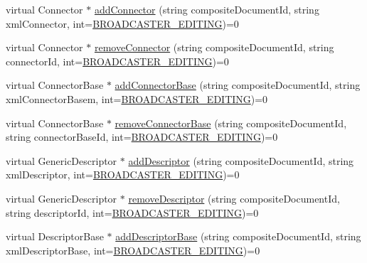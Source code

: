 \begin{DoxyCompactItemize}
\item 
virtual Connector $\ast$ \hyperlink{classbr_1_1ufscar_1_1lince_1_1ginga_1_1wac_1_1editing_1_1IFormatterAdapter_a540918ec7898b4400e8a6884f250516e}{addConnector} (string compositeDocumentId, string xmlConnector, int=\hyperlink{classbr_1_1ufscar_1_1lince_1_1ginga_1_1wac_1_1editing_1_1IFormatterAdapter_a60586f9a11e5cefcfecef9386c28d4bd}{BROADCASTER\_\-EDITING})=0
\item 
virtual Connector $\ast$ \hyperlink{classbr_1_1ufscar_1_1lince_1_1ginga_1_1wac_1_1editing_1_1IFormatterAdapter_a825cefaf9055043bef55540808f736e4}{removeConnector} (string compositeDocumentId, string connectorId, int=\hyperlink{classbr_1_1ufscar_1_1lince_1_1ginga_1_1wac_1_1editing_1_1IFormatterAdapter_a60586f9a11e5cefcfecef9386c28d4bd}{BROADCASTER\_\-EDITING})=0
\item 
virtual ConnectorBase $\ast$ \hyperlink{classbr_1_1ufscar_1_1lince_1_1ginga_1_1wac_1_1editing_1_1IFormatterAdapter_a5c963a0a746a97eb226c4648331c1a7f}{addConnectorBase} (string compositeDocumentId, string xmlConnectorBasem, int=\hyperlink{classbr_1_1ufscar_1_1lince_1_1ginga_1_1wac_1_1editing_1_1IFormatterAdapter_a60586f9a11e5cefcfecef9386c28d4bd}{BROADCASTER\_\-EDITING})=0
\item 
virtual ConnectorBase $\ast$ \hyperlink{classbr_1_1ufscar_1_1lince_1_1ginga_1_1wac_1_1editing_1_1IFormatterAdapter_a2a94ce80149177cdc18c4148d3d3a1c9}{removeConnectorBase} (string compositeDocumentId, string connectorBaseId, int=\hyperlink{classbr_1_1ufscar_1_1lince_1_1ginga_1_1wac_1_1editing_1_1IFormatterAdapter_a60586f9a11e5cefcfecef9386c28d4bd}{BROADCASTER\_\-EDITING})=0
\item 
virtual GenericDescriptor $\ast$ \hyperlink{classbr_1_1ufscar_1_1lince_1_1ginga_1_1wac_1_1editing_1_1IFormatterAdapter_a019d61ae0261d24cd89e6af449bc8bdb}{addDescriptor} (string compositeDocumentId, string xmlDescriptor, int=\hyperlink{classbr_1_1ufscar_1_1lince_1_1ginga_1_1wac_1_1editing_1_1IFormatterAdapter_a60586f9a11e5cefcfecef9386c28d4bd}{BROADCASTER\_\-EDITING})=0
\item 
virtual GenericDescriptor $\ast$ \hyperlink{classbr_1_1ufscar_1_1lince_1_1ginga_1_1wac_1_1editing_1_1IFormatterAdapter_adf3f2f8459ce0ac8a6e32c9542eb937f}{removeDescriptor} (string compositeDocumentId, string descriptorId, int=\hyperlink{classbr_1_1ufscar_1_1lince_1_1ginga_1_1wac_1_1editing_1_1IFormatterAdapter_a60586f9a11e5cefcfecef9386c28d4bd}{BROADCASTER\_\-EDITING})=0
\item 
virtual DescriptorBase $\ast$ \hyperlink{classbr_1_1ufscar_1_1lince_1_1ginga_1_1wac_1_1editing_1_1IFormatterAdapter_a22f741245601c4b74a962755657e97de}{addDescriptorBase} (string compositeDocumentId, string xmlDescriptorBase, int=\hyperlink{classbr_1_1ufscar_1_1lince_1_1ginga_1_1wac_1_1editing_1_1IFormatterAdapter_a60586f9a11e5cefcfecef9386c28d4bd}{BROADCASTER\_\-EDITING})=0

\end{DoxyCompactItemize}
